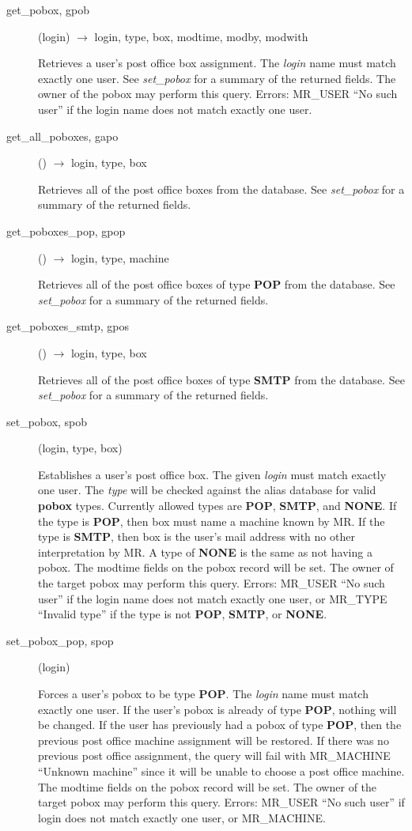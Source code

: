 \begin{description}
\item[get\_pobox, gpob](login) $\rightarrow$ login, type, box, modtime,
modby, modwith

Retrieves a user's post office box assignment. The {\em login} name
must match exactly one user. See {\em set\_pobox} for a summary of the
returned fields. The owner of the pobox may perform this query.
Errors: MR\_USER ``No such user'' if the login name does not match
exactly one user.

\item[get\_all\_poboxes, gapo]() $\rightarrow$ login, type, box

Retrieves all of the post office boxes from the database.  See
{\em set\_pobox} for a summary of the returned fields.

\item[get\_poboxes\_pop, gpop]() $\rightarrow$ login, type, machine

Retrieves all of the post office boxes of type {\bf POP} from the
database.  See {\em set\_pobox} for a summary of the returned fields.

\item[get\_poboxes\_smtp, gpos]() $\rightarrow$ login, type, box

Retrieves all of the post office boxes of type {\bf SMTP} from the
database.  See {\em set\_pobox} for a summary of the returned fields.

\item[set\_pobox, spob](login, type, box)

Establishes a user's post office box.  The given {\em login} must match
exactly one user.  The {\em type} will be checked against the alias
database for valid {\bf pobox} types.  Currently allowed types are
{\bf POP}, {\bf SMTP}, and {\bf NONE}.  If the type is {\bf POP}, then box
must name a machine known by MR.  If the type is {\bf SMTP}, then box
is the user's mail address with no other interpretation by MR.  A
type of {\bf NONE} is the same as not having a pobox.  The modtime
fields on the pobox record will be set.  The owner of the target pobox
may perform this query.  Errors: MR\_USER ``No such user'' if the login
name does not match exactly one user, or MR\_TYPE ``Invalid type'' if
the type is not {\bf POP}, {\bf SMTP}, or {\bf NONE}.

\item[set\_pobox\_pop, spop](login)

Forces a user's pobox to be type {\bf POP}.  The {\em login} name must
match exactly one user.  If the user's pobox is already of type
{\bf POP}, nothing will be changed.  If the user has previously had a
pobox of type {\bf POP}, then the previous post office machine
assignment will be restored.  If there was no previous post office
assignment, the query will fail with MR\_MACHINE ``Unknown machine''
since it will be unable to choose a post office machine.  The modtime
fields on the pobox record will be set.  The owner of the target pobox
may perform this query.  Errors: MR\_USER ``No such user'' if login does
not match exactly one user, or MR\_MACHINE.


\end{description}
